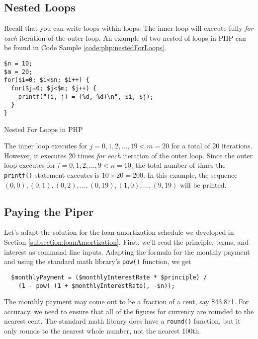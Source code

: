 \subsection{Nested Loops}

Recall that you can write loops within loops.  The inner loop will execute fully 
\emph{for each} iteration of the outer loop.  An example of two nested of
loops in PHP can be found in Code Sample \ref{code:php:nestedForLoops}.

\begin{listing}[H]
\begin{verbatim}
$n = 10;
$m = 20;
for($i=0; $i<$n; $i++) {
  for($j=0; $j<$m; $j++) {
    printf("(i, j) = (%d, %d)\n", $i, $j);
  }
}
\end{verbatim}
  \caption{Nested For Loops in PHP}
  \label{code:php:nestedForLoops}
\end{listing}

The inner loop executes for $j = 0, 1, 2, \ldots, 19 < m = 20$ for a total
of 20 iterations.  However, it executes 20 times \emph{for each} iteration of
the outer loop.  Since the outer loop executes for $i = 0, 1, 2, \ldots, 9 < n = 10$, 
the total number of times the \texttt{printf()} statement executes is
$10 \times 20 = 200$.  In this example, the sequence $(0, 0), (0, 1), (0, 2), \ldots, (0,19), (1, 0), \ldots, (9, 19)$
will be printed.

\subsection{Paying the Piper}

Let's adapt the solution for the loan amortization schedule we developed in 
Section \ref{subsection:loanAmortization}.  First, we'll read the principle, 
terms, and interest as command line inputs. Adapting the formula for 
the monthly payment and using the standard
math library's \texttt{pow()} function, we get

\begin{verbatim}
  $monthlyPayment = ($monthlyInterestRate * $principle) / 
  	(1 - pow( (1 + $monthlyInterestRate), -$n));
\end{verbatim}

The monthly payment may come out to be a fraction of a cent, say \$43.871.  For 
accuracy, we need to ensure that all of the figures for currency are rounded
to the nearest cent.  The standard math library does have a \texttt{round()}
function, but it only rounds to the nearest whole number, not the nearest
100th.

